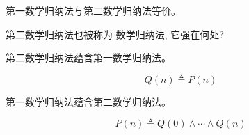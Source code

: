 \begin{frame}{}
  \begin{theorem}[数学归纳法]
    第一数学归纳法与第二数学归纳法等价。
  \end{theorem}

  \pause
  \vspace{0.50cm}
  \begin{center}
    { 第二数学归纳法也被称为 数学归纳法, 它强在何处?}
  \end{center}
\end{frame}

\begin{frame}{}
  \begin{lemma}
    第二数学归纳法蕴含第一数学归纳法。
  \end{lemma}

  \pause
  \[
    Q(n) \triangleq P(n)
  \]
\end{frame}

\begin{frame}{}
  \begin{lemma}
    第一数学归纳法蕴含第二数学归纳法。
  \end{lemma}

  \pause
  \[
    P(n) \triangleq Q(0) \land \cdots \land Q(n)
  \]
\end{frame}

\begin{frame}{}
  \begin{center}

  \end{center}
\end{frame}

